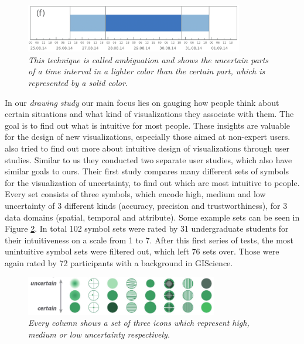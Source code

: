 \begin{figure}[H]
	\centering
	\includegraphics[width=0.85\textwidth]{figures/ambiguation.png}
	\caption{\textit{This technique is called ambiguation and shows the uncertain parts of a time interval in a lighter color than the certain part, which is represented by a solid color. \cite{gschwandtner2016visual}}}
	\label{fig:ambiguation}
\end{figure}

In our \textit{drawing study} our main focus lies on gauging how people think about certain situations and what kind of visualizations they associate with them. The goal is to find out what is intuitive for most people. These insights are valuable for the design of new visualizations, especially those aimed at non-expert users. \citet{maceachren2012visual} also tried to find out more about intuitive design of visualizations through user studies. Similar to us they conducted two separate user studies, which also have similar goals to ours. Their first study compares many different sets of symbols for the visualization of uncertainty, to find out which are most intuitive to people. Every set consists of three symbols, which encode high, medium and low uncertainty of 3 different kinds (accuracy, precision and trustworthiness), for 3 data domains (spatial, temporal and attribute). Some example sets can be seen in Figure \ref{fig:sets}. In total 102 symbol sets were rated by 31 undergraduate students for their intuitiveness on a scale from 1 to 7. After this first series of tests, the most unintuitive symbol sets were filtered out, which left 76 sets over. Those were again rated by 72 participants with a background in GIScience. \par \medskip

\begin{figure}[H]
	\centering
	\includegraphics[width=0.75\textwidth]{figures/sets.png}
	\caption{\textit{Every column shows a set of three icons which represent high, medium or low uncertainty respectively. \cite{maceachren2012visual}}}
	\label{fig:sets}
\end{figure}


